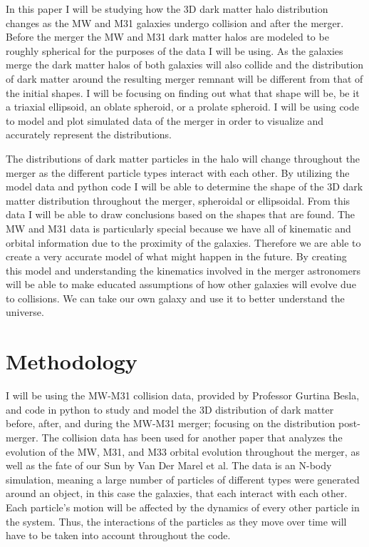 \documentclass{aastex63}
\begin{document}
In this paper I will be studying how the 3D dark matter halo distribution changes as the MW and M31 galaxies undergo collision and after the merger. Before the merger the MW and M31 dark matter halos are modeled to be roughly spherical for the purposes of the data I will be using. As the galaxies merge the dark matter halos of both galaxies will also collide and the distribution of dark matter around the resulting merger remnant will be different from that of the initial shapes. I will be focusing on finding out what that shape will be, be it a triaxial ellipsoid, an oblate spheroid, or a prolate spheroid.  I will be using code to model and plot simulated data of the merger in order to visualize and accurately represent the distributions.

The distributions of dark matter particles in the halo will change throughout the merger as the different particle types interact with each other. By utilizing the model data and python code I will be able to determine the shape of the 3D dark matter distribution throughout the merger, spheroidal or ellipsoidal. From this data I will be able to draw conclusions based on the shapes that are found. 
The MW and M31 data is particularly special because we have all of kinematic and orbital information due to the proximity of the galaxies. Therefore we are able to create a very accurate model of what might happen in the future. By creating this model and understanding the kinematics involved in the merger astronomers will be able to make educated assumptions of how other galaxies will evolve due to collisions. We can take our own galaxy and use it to better understand the universe. 

\section{Methodology}

I will be using the MW-M31 collision data, provided by Professor Gurtina Besla, and code in python to study and model the 3D distribution of dark matter before, after, and during the MW-M31 merger; focusing on the distribution post-merger. The collision data has been used for another paper that analyzes the evolution of the MW, M31, and M33 orbital evolution throughout the merger, as well as the fate of our Sun by Van Der Marel et al. \cite{Marel_2012} The data is an N-body simulation, meaning a large number of particles of different types were generated around an object, in this case the galaxies, that each interact with each other. Each particle’s motion will be affected by the dynamics of every other particle in the system. Thus, the interactions of the particles as they move over time will have to be taken into account throughout the code.
\end{document}
